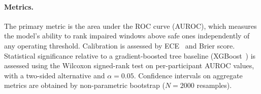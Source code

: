 \paragraph{Metrics.}
The primary metric is the area under the ROC curve (AUROC), which measures
the model's ability to rank impaired windows above safe ones independently
of any operating threshold.
Calibration is assessed by ECE~\cite{Guo2017} and Brier score.
Statistical significance relative to a gradient-boosted tree baseline
(XGBoost~\cite{Chen2016}) is assessed using the Wilcoxon signed-rank test
on per-participant AUROC values, with a two-sided alternative and
$\alpha = 0.05$.
Confidence intervals on aggregate metrics are obtained by
non-parametric bootstrap ($N = 2000$ resamples).
